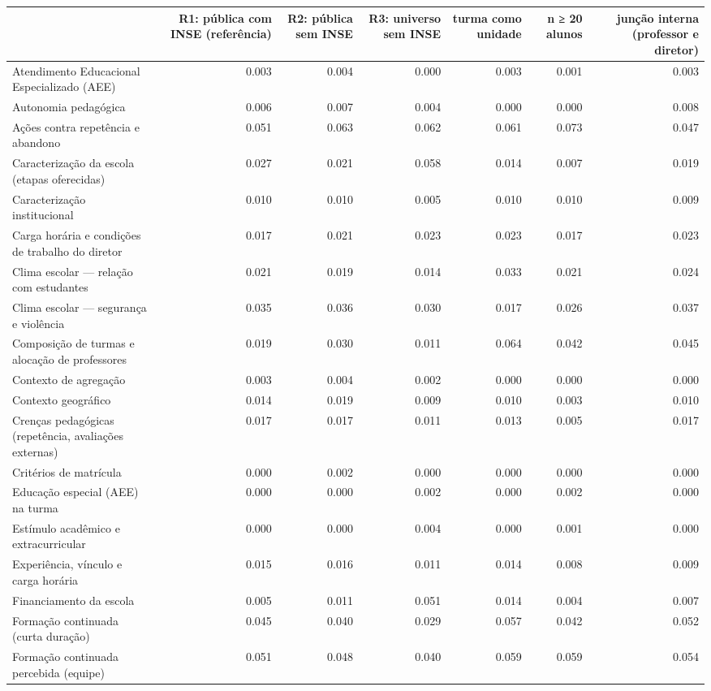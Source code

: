 \begin{tabular}{lrrrrrr}
\toprule
 & R1: pública com INSE (referência) & R2: pública sem INSE & R3: universo sem INSE & turma como unidade & n ≥ 20 alunos & junção interna (professor e diretor) \\
\midrule
Atendimento Educacional Especializado (AEE) & 0.003 & 0.004 & 0.000 & 0.003 & 0.001 & 0.003 \\
Autonomia pedagógica & 0.006 & 0.007 & 0.004 & 0.000 & 0.000 & 0.008 \\
Ações contra repetência e abandono & 0.051 & 0.063 & 0.062 & 0.061 & 0.073 & 0.047 \\
Caracterização da escola (etapas oferecidas) & 0.027 & 0.021 & 0.058 & 0.014 & 0.007 & 0.019 \\
Caracterização institucional & 0.010 & 0.010 & 0.005 & 0.010 & 0.010 & 0.009 \\
Carga horária e condições de trabalho do diretor & 0.017 & 0.021 & 0.023 & 0.023 & 0.017 & 0.023 \\
Clima escolar — relação com estudantes & 0.021 & 0.019 & 0.014 & 0.033 & 0.021 & 0.024 \\
Clima escolar — segurança e violência & 0.035 & 0.036 & 0.030 & 0.017 & 0.026 & 0.037 \\
Composição de turmas e alocação de professores & 0.019 & 0.030 & 0.011 & 0.064 & 0.042 & 0.045 \\
Contexto de agregação & 0.003 & 0.004 & 0.002 & 0.000 & 0.000 & 0.000 \\
Contexto geográfico & 0.014 & 0.019 & 0.009 & 0.010 & 0.003 & 0.010 \\
Crenças pedagógicas (repetência, avaliações externas) & 0.017 & 0.017 & 0.011 & 0.013 & 0.005 & 0.017 \\
Critérios de matrícula & 0.000 & 0.002 & 0.000 & 0.000 & 0.000 & 0.000 \\
Educação especial (AEE) na turma & 0.000 & 0.000 & 0.002 & 0.000 & 0.002 & 0.000 \\
Estímulo acadêmico e extracurricular & 0.000 & 0.000 & 0.004 & 0.000 & 0.001 & 0.000 \\
Experiência, vínculo e carga horária & 0.015 & 0.016 & 0.011 & 0.014 & 0.008 & 0.009 \\
Financiamento da escola & 0.005 & 0.011 & 0.051 & 0.014 & 0.004 & 0.007 \\
Formação continuada (curta duração) & 0.045 & 0.040 & 0.029 & 0.057 & 0.042 & 0.052 \\
Formação continuada percebida (equipe) & 0.051 & 0.048 & 0.040 & 0.059 & 0.059 & 0.054 \\

\end{tabular}
